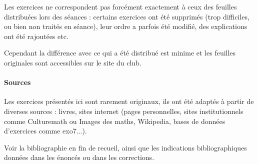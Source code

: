 Les exercices ne correspondent pas forcément exactement à ceux des feuilles distribuées lors des séances : certains exercices ont été supprimés (trop difficiles, ou bien non traités en séance), leur ordre a parfois été modifié, des explications ont été rajoutées etc.

 
Cependant la différence avec ce qui a été distribué est minime et les feuilles originales sont accessibles sur le site du club.

\paragraph{Sources}


Les exercices présentés ici sont rarement originaux, ils ont été adaptés à partir de diverses sources : livres, sites internet (pages personnelles, sites institutionnels comme Culturemath ou Images des maths, Wikipedia, bases de données d'exercices comme exo7...).

Voir la bibliographie en fin de recueil, ainsi que les indications bibliographiques données dans les énoncés ou dans les corrections.






















\fin



